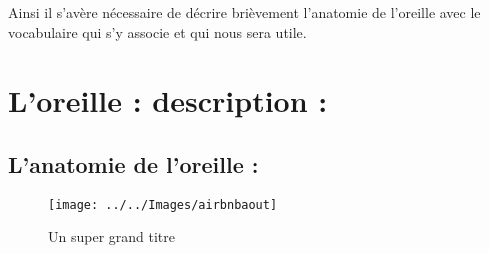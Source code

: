 \documentclass[12pt,french]{report}
\begin{document}
Ainsi il s'avère nécessaire de décrire brièvement l'anatomie de l'oreille
avec le vocabulaire qui s'y associe et qui nous sera utile.

\section{L'oreille : description : }

\subsection{L'anatomie de l'oreille :}

\begin{figure}
	\centering
	\texttt{[image: ../../Images/airbnbaout]}
	\caption[Un test]{Un super grand titre}
	\label{fig:airbnbaout}
\end{figure}


%
\end{document}
